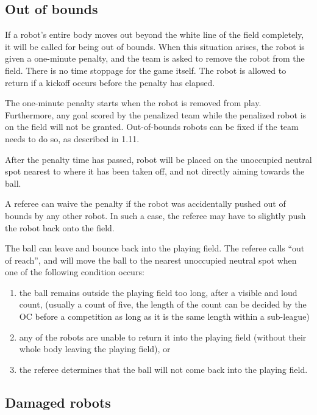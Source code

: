 \documentclass{article}
\begin{document}
\subsection{Out of bounds \label{ref-011}}

If a robot's entire body moves out beyond the white line of the field completely, it will be called for being out of bounds. When this situation arises, the robot is given a one-minute penalty, and the team is asked to remove the robot from the field. There is no time stoppage for the game itself. The robot is allowed to return if a kickoff occurs before the penalty has elapsed.

The one-minute penalty starts when the robot is removed from play. Furthermore, any goal scored by the penalized team while the penalized robot is on the field will not be granted. Out-of-bounds robots can be fixed if the team needs to do so, as described in 1.11.

After the penalty time has passed, robot will be placed on the unoccupied neutral spot nearest to where it has been taken off, and not directly aiming towards the ball.

A referee can waive the penalty if the robot was accidentally pushed out of bounds by any other robot. In such a case, the referee may have to slightly push the robot back onto the field.

The ball can leave and bounce back into the playing field. The referee calls ``out of reach'', and will move the ball to the nearest unoccupied neutral spot when one of the following condition occurs:

\begin{enumerate}
    \item  the ball remains outside the playing field too long, after a visible and loud count, (usually a count of five, the length of the count can be decided by the OC before a competition as long as it is the same length within a sub-league)
    \item any of the robots are unable to return it into the playing field (without their whole body leaving the playing field), or
    \item the referee determines that the ball will not come back into the playing field.
\end{enumerate}

\subsection{Damaged robots \label{ref-012}}
\end{document}
